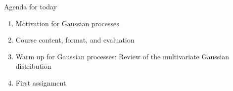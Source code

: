 

\newcommand{\lecturenumber}{0}
\newcommand{\lecturetitle}{Example}

\author{A.N. Onymous}
\date{Thursday 16.2.2023}




\begin{frame}
\titlepage
\end{frame}

\begin{frame}{Agenda for today}
\begin{enumerate}
	\setlength{\itemsep}{10mm}
	\item Motivation for Gaussian processes
	\item Course content, format, and evaluation
	\item Warm up for Gaussian processes: Review of the multivariate Gaussian distribution
	\item First assignment
\end{enumerate}
\end{frame}

